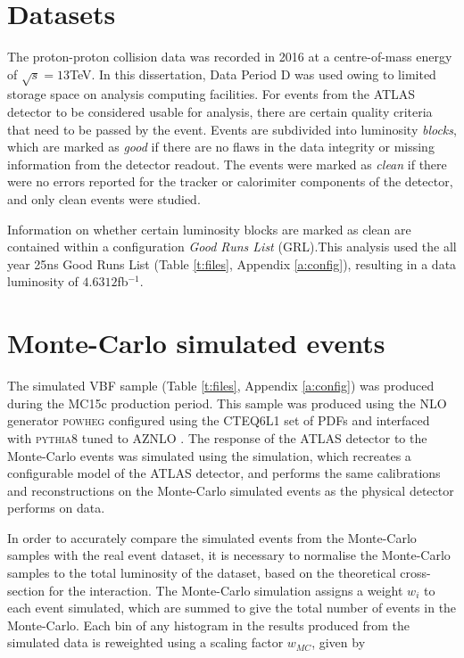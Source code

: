 	\section{Datasets}

	The proton-proton collision data was recorded in 2016 at a centre-of-mass energy of $\sqrt{s}=13$TeV. In this dissertation, Data Period D was used owing to limited storage space on analysis computing facilities. For events from the ATLAS detector to be considered usable for analysis, there are certain quality criteria that need to be passed by the event. Events are subdivided into luminosity \textit{blocks}, which are marked as \textit{good} if there are no flaws in the data integrity or missing information from the detector readout. The events were marked as \textit{clean} if there were no errors reported for the tracker or calorimiter components of the detector, and only clean events were studied.

	Information on whether certain luminosity blocks are marked as clean are contained within a configuration \textit{Good Runs List} (GRL).This analysis used the all year 25ns Good Runs List (Table \ref{t:files}, Appendix \ref{a:config}), resulting in a data luminosity of $4.6312$fb$^{-1}$.

	\section{Monte-Carlo simulated events}

		 The simulated VBF sample (Table \ref{t:files}, Appendix \ref{a:config}) was produced during the MC15c production period. This sample was produced using the NLO generator \textsc{powheg} configured using the CTEQ6L1 \cite{CTEQ} set of PDFs and interfaced with \textsc{pythia8} tuned to AZNLO \cite{AZNLO}. The response of the ATLAS detector to the Monte-Carlo events was simulated using the  \cite{geant4, geant4atlas} simulation, which recreates a configurable model of the ATLAS detector, and performs the same calibrations and reconstructions on the Monte-Carlo simulated events as the physical detector performs on data.

		 In order to accurately compare the simulated events from the Monte-Carlo samples with the real event dataset, it is necessary to normalise the Monte-Carlo samples to the total luminosity of the dataset, based on the theoretical cross-section for the interaction. The Monte-Carlo simulation assigns a weight $w_i$ to each event simulated, which are summed to give the total number of events in the Monte-Carlo. Each bin of any histogram in the results produced from the simulated data is reweighted using a scaling factor $w_{MC}$, given by

